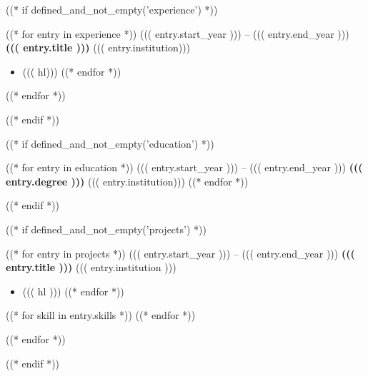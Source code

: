 \documentclass[
	a4paper,
	sidebarwidth=0.33\paperwidth,
	profilepicstyle=profilecircle,
]{fortysecondscv}
\begin{document}
\makefrontsidebar

((* if defined_and_not_empty('experience') *))
\begin{cvtable}
	((* for entry in experience *))
		\cvitem
			{((( entry.start_year ))) -- ((( entry.end_year )))}
			{\textbf{((( entry.title )))}}
			{((( entry.institution)))}
			{ 
				{\small
				\begin{itemize}[topsep=0pt,itemsep=0pt,leftmargin=*]
					((* for hl in entry.highlights *)) \item ((( hl))) ((* endfor *))
				\end{itemize}
				}
			}
	((* endfor *))
\end{cvtable}
((* endif *))

((* if defined_and_not_empty('education') *))
\begin{cvtable}
	((* for entry in education *))
		\cvitem
			{((( entry.start_year ))) -- ((( entry.end_year )))}
			{\textbf{((( entry.degree )))}}
			{((( entry.institution)))}
			{}
	((* endfor *))
\end{cvtable}
((* endif *))

((* if defined_and_not_empty('projects') *))
\begin{cvtable}
	((* for entry in projects *))
		\cvitem
			{((( entry.start_year ))) -- ((( entry.end_year )))}
			{\textbf{((( entry.title )))}}
			{((( entry.institution )))}
			{
				\small 
				\begin{itemize}[topsep=0pt,itemsep=0pt,leftmargin=*]
					((* for hl in entry.highlights *)) \item ((( hl ))) ((* endfor *))
				\end{itemize}
				\vspace{0.1em}
				((* for skill in entry.skills *))  ((* endfor *))
			}
	((* endfor *))
\end{cvtable}
((* endif *))
\end{document}
